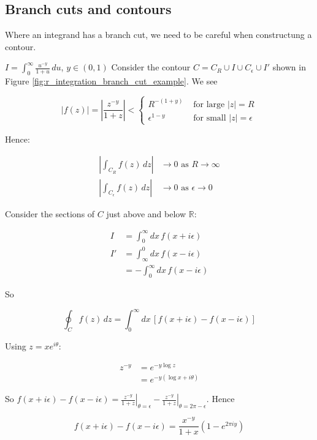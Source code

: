 \documentclass{../../physics_notes}
\begin{document}
\subsection{Branch cuts and contours }

Where an integrand has a branch cut, we need to be careful when constructung a contour. 

\begin{example}{$I = \int_0^\infty \frac{u^{-y}}{1+u}\, du$, $y\in(0,1)$}
	Consider the contour $C = C_R \cup I \cup C_\epsilon \cup I'$ shown in Figure \ref{fig:r_integration_branch_cut_example}. We see

	\[
		|f(z)| = \left|\frac{z^{-y}}{1+z}\right| < \begin{cases}
			R^{-(1+y)} & \text{ for large } |z| = R \\
			\epsilon^{1-y} & \text{ for small } |z| = \epsilon
		\end{cases}
	\]

	Hence:

	\begin{align*}
		\left|\int_{C_R} f(z)\, dz \right| &\to 0 \text{ as } R \to\infty \\
		\left|\int_{C_\epsilon} f(z)\, dz \right| &\to 0 \text{ as } \epsilon \to 0
	\end{align*}

	Consider the sections of $C$ just above and below $\mathbb{R}$:

	\begin{align*}
		I &= \int_0^\infty dx\, f(x+i\epsilon) \\
		I' &= \int_\infty^0 dx\, f(x-i\epsilon) \\
		&= -\int_0^\infty dx\, f(x-i\epsilon)
	\end{align*}

	So 

	\[
		\oint_C f(z)\, dz = \int_0^\infty dx\, \left[f(x+i\epsilon) - f(x-i\epsilon)\right]
	\]

	Using $z = xe^{i\theta}$:

	\begin{align*}
		z^{-y} &= e^{-y\log{z}} \\
		&= e^{-y(\log{x} + i\theta)}
	\end{align*}

	So $f(x+i\epsilon) - f(x-i\epsilon) = \left.\frac{z^{-y}}{1+z}\right|_{\theta=\epsilon}- \left.\frac{z^{-y}}{1+z}\right|_{\theta = 2\pi -\epsilon}$. Hence

	\[
		f(x+i\epsilon) - f(x-i\epsilon) = \frac{x^{-y}}{1+x}\left(1-e^{2\pi iy}\right)
	\]


\end{example}
\end{document}
